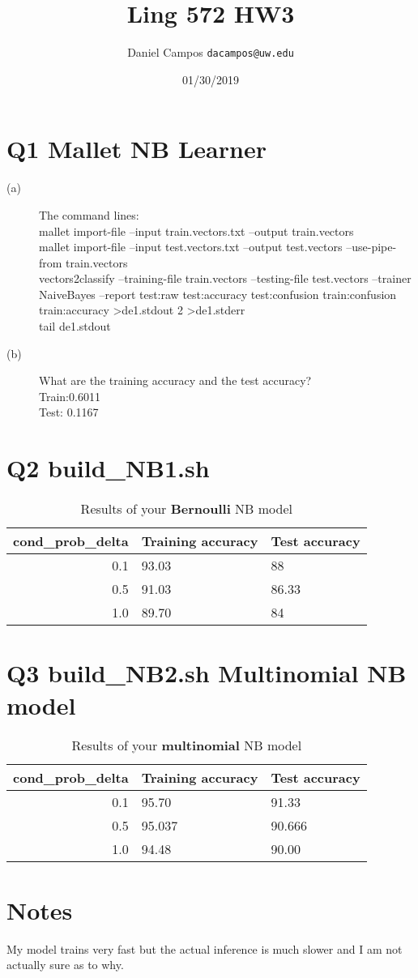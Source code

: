 \documentclass[11pt]{article}
\begin{document}
\title{Ling 572 HW3}
\author{Daniel Campos  \tt {dacampos@uw.edu}}
\date{01/30/2019}
\maketitle 
\section{ Q1 Mallet NB Learner}
\begin{description}
\item [(a)] The command lines: \\
mallet import-file --input train.vectors.txt --output train.vectors\\
mallet import-file --input test.vectors.txt --output test.vectors --use-pipe-from train.vectors \\
vectors2classify --training-file train.vectors --testing-file test.vectors --trainer NaiveBayes --report test:raw test:accuracy test:confusion train:confusion train:accuracy \textgreater de1.stdout 2 \textgreater de1.stderr \\
tail de1.stdout 
\item [(b)] What are the training accuracy and the test accuracy? \\
Train:0.6011 \\
Test: 0.1167
\end{description}
\section{ Q2 build\_NB1.sh}
\begin{table}[h]
\centering
\caption{Results of your {\bf Bernoulli} NB model}
\label{table1}
\begin{tabular}{|r|l|l|} \hline
cond\_prob\_delta   & Training accuracy & Test accuracy \\ \hline
0.1       & 93.03  & 88   \\ \hline
0.5       & 91.03 &   86.33 \\ \hline
1.0      & 89.70 &  84  \\ \hline
\end{tabular}
\end{table}
\section{ Q3 build\_NB2.sh Multinomial NB model}
\begin{table}[h]
\centering
\caption{Results of your {\bf multinomial} NB model}
\label{table2}
\begin{tabular}{|r|l|l|} \hline
cond\_prob\_delta   & Training accuracy & Test accuracy \\ \hline
0.1       & 95.70 &  91.33  \\ \hline
0.5       &95.037  & 90.666    \\ \hline
1.0     & 94.48  &  90.00  \\ \hline
\end{tabular}
\end{table}
\section{ Notes}
My model trains very fast but the actual inference is much slower and I am not actually sure as to why. 
\end{document}
